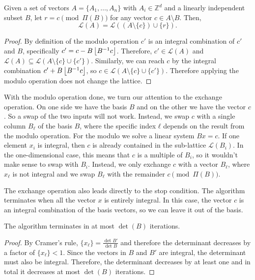 \begin{lemma}
  Given a set of vectors $A = \{A_1, \dots, A_n\}$ with $A_i ∈ ℤ^d$
  and a linearly independent subset $B$,
  let $r = c \pmod{Π(B)}$ for any vector $c ∈ A \setminus B$.
  Then,
  \[
    \mathcal L(A) = \mathcal L((A \setminus \{c\}) ∪ \{r\}).
  \]
\end{lemma}

\begin{proof}
  By definition of the modulo operation $c'$ is an integral combination of $c'$ and $B$,
  specifically $c' = c - B \left\lfloor B^{-1} c\right\rfloor$.
  Therefore, $c' ∈ \mathcal L(A)$ and $\mathcal L(A) ⊆ \mathcal L(A \setminus \{c\} ∪ \{c'\})$.
  Similarly, we can reach $c$ by the integral combination $c' + B \left\lfloor B^{-1} c\right\rfloor$,
  so $c ∈ \mathcal L(A \setminus \{c\} ∪ \{c'\})$.
  Therefore applying the modulo operation does not change the lattice.
\end{proof}

With the modulo operation done, we turn our attention to the exchange operation.
On one side we have the basis $B$ and on the other we have the vector $c$.
So a swap of the two inputs will not work.
Instead, we swap $c$ with a single column $B_ℓ$ of the basis $B$,
where the specific index $ℓ$ depends on the result from the modulo operation.
For the modulo we solve a linear system $Bx = c$.
If one element $x_i$ is integral, then $c$ is already contained in the
sub-lattice $\mathcal L(B_i)$.
In the one-dimensional case, this means that $c$ is a multiple of $B_i$,
so it wouldn't make sense to swap with $B_i$.
Instead, we only exchange $c$ with a vector $B_ℓ$, where $x_ℓ$ is not integral
and we swap $B_ℓ$ with the remainder $c \pmod{Π(B)}$.

The exchange operation also leads directly to the stop condition.
The algorithm terminates when all the vector $x$ is entirely integral.
In this case, the vector $c$ is an integral combination of the basis vectors,
so we can leave it out of the basis.

\begin{lemma}
  The algorithm terminates in at most $\det(B)$ iterations.
\end{lemma}

\begin{proof}
  By Cramer's rule, $\{x_ℓ\} = \frac{\det B'}{\det B}$
  and therefore the determinant decreases by a factor of $\{x_ℓ\} < 1$.
  Since the vectors in $B$ and $B'$ are integral, the determinant must also be integral.
  Therefore, the determinant decreases by at least one and in total it
  decreases at most $\det(B)$ iterations.
\end{proof}


